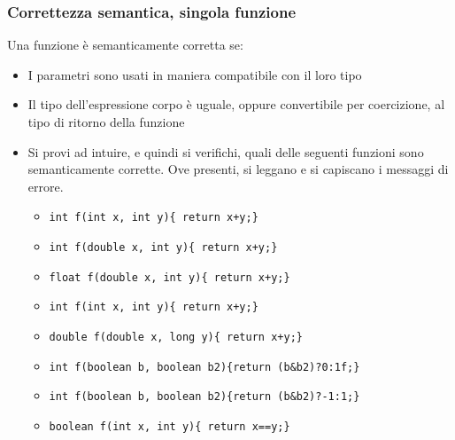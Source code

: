 \documentclass{beamer}
\begin{document}
\begin{frame}
\frametitle{Correttezza semantica, singola funzione}
Una funzione è semanticamente corretta se:
\begin{itemize}
 \item I parametri sono usati in maniera compatibile con il loro tipo
 \item Il tipo dell'espressione corpo è uguale, oppure convertibile per coercizione, al tipo di ritorno della funzione
 \item Si provi ad intuire, e quindi si verifichi, quali delle seguenti funzioni sono semanticamente corrette. Ove presenti, si leggano e si capiscano i messaggi di errore.
\begin{itemize}
 \item \texttt{int f(int x, int y)\{ return x+y;\}}
 \item \texttt{int f(double x, int y)\{ return x+y;\}}
 \item \texttt{float f(double x, int y)\{ return x+y;\}}
 \item \texttt{int f(int x, int y)\{ return x+\textquotedbl{}y\textquotedbl{};\}}
 \item \texttt{double f(double x, long y)\{ return x+y;\}}
 \item \texttt{int f(boolean b, boolean b2)\{return (b\&{}b2)?0:1f;\}}
 \item \texttt{int f(boolean b, boolean b2)\{return (b\&{}b2)?-1:1;\}}
 \item \texttt{boolean f(int x, int y)\{ return x==y;\}}
\end{itemize}
\end{itemize}
\end{frame}
\end{document}
